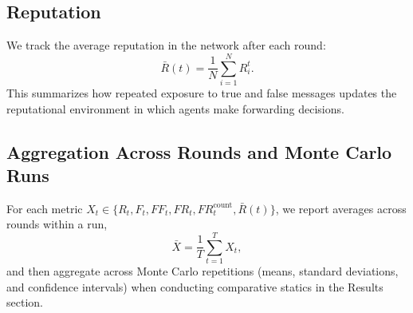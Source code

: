 \subsection{Reputation}

We track the average reputation in the network after each round:
\[
\bar{R}(t) = \frac{1}{N}\sum_{i=1}^{N} R_i^t.
\]
This summarizes how repeated exposure to true and false messages updates the reputational environment in which agents make forwarding decisions.

\subsection{Aggregation Across Rounds and Monte Carlo Runs}

For each metric $X_t \in \{R_t, F_t, FF_t, FR_t, FR^{\text{count}}_t, \bar{R}(t)\}$, we report averages across rounds within a run,
\[
\bar{X} = \frac{1}{T}\sum_{t=1}^{T} X_t,
\]
and then aggregate across Monte Carlo repetitions (means, standard deviations, and confidence intervals) when conducting comparative statics in the Results section.
